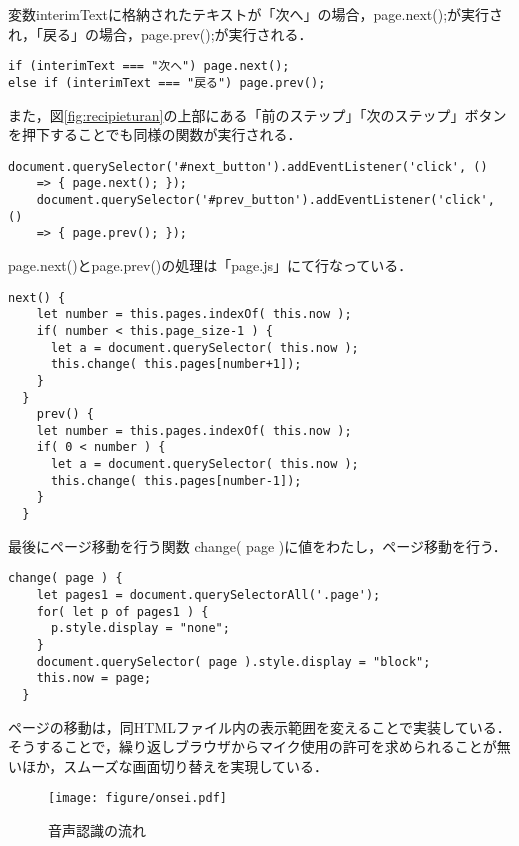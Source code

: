 \documentclass[a4j,12pt]{jsarticle}
\begin{document}
 変数interimTextに格納されたテキストが「次へ」の場合，page.next();が実行され，「戻る」の場合，page.prev();が実行される．
 
\begin{lstlisting}[basicstyle=\ttfamily\footnotesize, frame=single]
 if (interimText === "次へ") page.next();
else if (interimText === "戻る") page.prev();
 \end{lstlisting}

また，図\ref{fig:recipieturan}の上部にある「前のステップ」「次のステップ」ボタンを押下することでも同様の関数が実行される．
\begin{lstlisting}[basicstyle=\ttfamily\footnotesize, frame=single]
    document.querySelector('#next_button').addEventListener('click', ()
    => { page.next(); });
    document.querySelector('#prev_button').addEventListener('click', () 
    => { page.prev(); });
 \end{lstlisting}
 
 page.next()とpage.prev()の処理は「page.js」にて行なっている． 
 \begin{lstlisting}[basicstyle=\ttfamily\footnotesize, frame=single]
  next() {
    let number = this.pages.indexOf( this.now );
    if( number < this.page_size-1 ) {
      let a = document.querySelector( this.now );
      this.change( this.pages[number+1]);
    }
  }
    prev() {
    let number = this.pages.indexOf( this.now );
    if( 0 < number ) {
      let a = document.querySelector( this.now );
      this.change( this.pages[number-1]);
    }
  }
 \end{lstlisting}

最後にページ移動を行う関数  change( page )に値をわたし，ページ移動を行う．

 \begin{lstlisting}[basicstyle=\ttfamily\footnotesize, frame=single]
  change( page ) {
    let pages1 = document.querySelectorAll('.page');
    for( let p of pages1 ) {　
      p.style.display = "none";
    }
    document.querySelector( page ).style.display = "block";
    this.now = page;
  }
 \end{lstlisting}

ページの移動は，同HTMLファイル内の表示範囲を変えることで実装している．
そうすることで，繰り返しブラウザからマイク使用の許可を求められることが無いほか，スムーズな画面切り替えを実現している．

\begin{figure}[htbp]
 \begin{center}
  \texttt{[image: figure/onsei.pdf]}
 \end{center}
  \caption{音声認識の流れ}
  \label{fig:onsei}
\end{figure}
\end{document}
